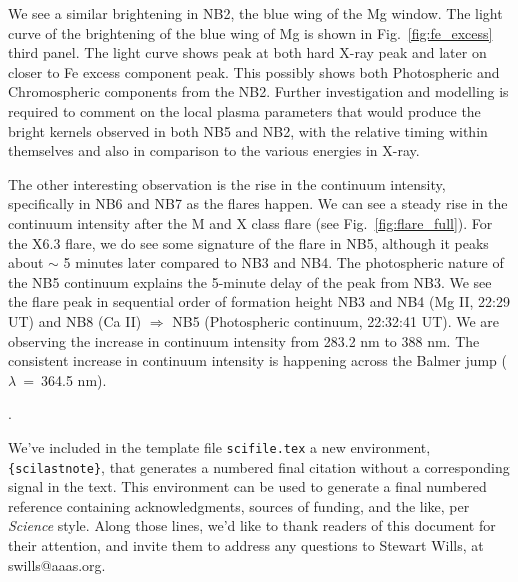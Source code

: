 \documentclass[12pt]{article}
\newcounter{lastnote}
\newenvironment{scilastnote}{%
\setcounter{lastnote}{\value{enumiv}}%
\addtocounter{lastnote}{+1}%
\begin{list}%
{\arabic{lastnote}.}
{\setlength{\leftmargin}{.22in}}
{\setlength{\labelsep}{.5em}}}
{\end{list}}
\begin{document}
We see a similar brightening in NB2, the blue wing of the Mg window. The light curve of the brightening of the blue wing of Mg is shown in Fig.~\ref{fig:fe_excess} third panel. The light curve shows peak at both hard X-ray peak and later on closer to Fe excess component peak. This possibly shows both Photospheric and Chromospheric components from the NB2. Further investigation and modelling is required to comment on the local plasma parameters that would produce the bright kernels observed in both NB5 and NB2, with the relative timing within themselves and also in comparison to the various energies in X-ray.

The other interesting observation is the rise in the continuum intensity, specifically in NB6 and NB7 as the flares happen. We can see a steady rise in the continuum intensity after the M and X class flare (see Fig.~\ref{fig:flare_full}). For the X6.3 flare, we do see some signature of the flare in NB5, although it peaks about $\sim$ 5 minutes later compared to NB3 and NB4. The photospheric nature of the NB5 continuum explains the 5-minute delay of the peak from NB3. We see the flare peak in sequential order of formation height NB3 and NB4 (Mg II, 22:29 UT) and NB8 (Ca II) $\Longrightarrow$ NB5 (Photospheric continuum, 22:32:41 UT). We are observing the increase in continuum intensity from 283.2 nm to 388 nm. The consistent increase in continuum intensity is happening across the Balmer jump ($\lambda$~=~364.5 nm).










\begin{scilastnote}
\item We've included in the template file \texttt{scifile.tex} a new
environment, \texttt{\{scilastnote\}}, that generates a numbered final
citation without a corresponding signal in the text.  This environment
can be used to generate a final numbered reference containing
acknowledgments, sources of funding, and the like, per {\it Science\/}
style.  Along those lines, we'd like to thank readers of this document
for their attention, and invite them to address any questions to
Stewart Wills, at swills@aaas.org.
\end{scilastnote}
\end{document}
